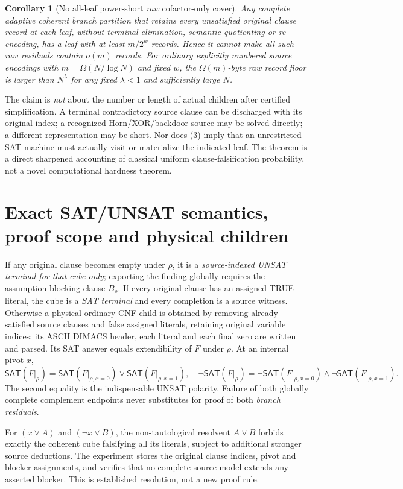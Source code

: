 \documentclass[11pt]{article}
\newtheorem{corollary}{Corollary}
\newcommand{\SAT}{\mathsf{SAT}}
\begin{document}
\begin{corollary}[No all-leaf power-short \emph{raw} cofactor-only cover]\label{cor:raw}
Any complete adaptive coherent branch partition that retains every unsatisfied original clause record at each leaf, without terminal elimination, semantic quotienting or re-encoding, has a leaf with at least $m/2^w$ records. Hence it cannot make \emph{all} such raw residuals contain $o(m)$ records. For ordinary explicitly numbered source encodings with $m=\Omega(N/\log N)$ and fixed $w$, the $\Omega(m)$-byte raw record floor is larger than $N^\lambda$ for any fixed $\lambda<1$ and sufficiently large $N$.
\end{corollary}
\noindent The claim is \emph{not} about the number or length of actual children after certified simplification. A terminal contradictory source clause can be discharged with its original index; a recognized Horn/XOR/backdoor source may be solved directly; a different representation may be short. Nor does (3) imply that an unrestricted SAT machine must actually visit or materialize the indicated leaf. The theorem is a direct sharpened accounting of classical uniform clause-falsification probability, not a novel computational hardness theorem.

\section{Exact SAT/UNSAT semantics, proof scope and physical children}
If any original clause becomes empty under $\rho$, it is a \emph{source-indexed UNSAT terminal for that cube only}; exporting the finding globally requires the assumption-blocking clause $B_\rho$. If every original clause has an assigned TRUE literal, the cube is a \emph{SAT terminal} and every completion is a source witness. Otherwise a physical ordinary CNF child is obtained by removing already satisfied source clauses and false assigned literals, retaining original variable indices; its ASCII DIMACS header, each literal and each final zero are written and parsed. Its SAT answer equals extendibility of $F$ under $\rho$. At an internal pivot $x$,
\[
\SAT(F|_\rho)
=\SAT(F|_{\rho,x=0})\lor \SAT(F|_{\rho,x=1}),
\quad
\neg\SAT(F|_\rho)
=\neg\SAT(F|_{\rho,x=0})\land\neg\SAT(F|_{\rho,x=1}).\tag{4}
\]
The second equality is the indispensable UNSAT polarity. Failure of both globally complete complement endpoints never substitutes for proof of both \emph{branch residuals}.

For $(x\lor A)$ and $(\neg x\lor B)$, the non-tautological resolvent $A\lor B$ forbids exactly the coherent cube falsifying all its literals, subject to additional stronger source deductions. The experiment stores the original clause indices, pivot and blocker assignments, and verifies that no complete source model extends any asserted blocker. This is established resolution, not a new proof rule.
\end{document}
